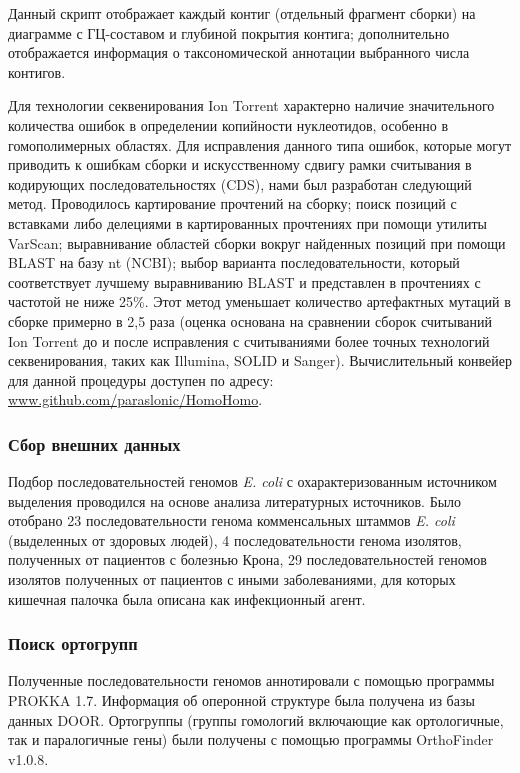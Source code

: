 Данный скрипт отображает каждый контиг (отдельный фрагмент сборки) на диаграмме с ГЦ-составом и глубиной покрытия контига; дополнительно отображается информация о таксономической аннотации выбранного числа контигов. 

Для технологии секвенирования Ion Torrent характерно наличие значительного количества ошибок в определении копийности нуклеотидов, особенно в гомополимерных областях. Для исправления данного типа ошибок, которые могут приводить к ошибкам сборки и искусственному сдвигу рамки считывания в кодирующих последовательностях (CDS), нами был разработан следующий метод. Проводилось картирование прочтений на сборку; поиск позиций с вставками либо делециями в картированных прочтениях при помощи утилиты VarScan; выравнивание областей сборки вокруг найденных позиций при помощи BLAST на базу nt (NCBI); выбор варианта последовательности, который соответствует лучшему выравниванию BLAST и представлен в прочтениях с частотой не ниже 25\%. Этот метод уменьшает количество артефактных мутаций в сборке примерно в 2,5 раза (оценка основана на сравнении сборок считываний Ion Torrent до и после исправления с считываниями более точных технологий секвенирования, таких как Illumina, SOLID и Sanger). Вычислительный конвейер для данной процедуры доступен по адресу: \url{www.github.com/paraslonic/HomoHomo}.


\subsubsection{Сбор внешних данных}
Подбор последовательностей геномов \textit{E. coli} с охарактеризованным источником выделения проводился на основе анализа литературных источников. Было отобрано 23 последовательности генома комменсальных штаммов \textit{E. coli} (выделенных от здоровых людей), 4 последовательности генома изолятов, полученных от пациентов с болезнью Крона, 29 последовательностей геномов изолятов полученных от пациентов с иными заболеваниями, для которых кишечная палочка была описана как инфекционный агент.

\subsubsection{Поиск ортогрупп}
Полученные последовательности геномов аннотировали с помощью программы PROKKA 1.7. Информация об оперонной структуре была получена из базы данных DOOR. Ортогруппы (группы гомологий включающие как ортологичные, так и паралогичные гены) были получены с помощью программы OrthoFinder v1.0.8. 

